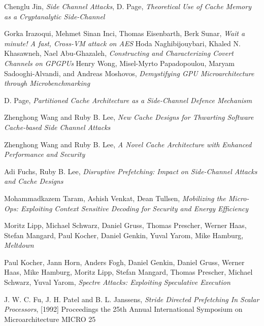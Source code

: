 \documentclass[twoside]{iitbreport}
\begin{document}
%
\begin{thebibliography}{99}
Chenglu Jin, {\it Side Channel Attacks},
D. Page, {\it Theoretical Use of Cache Memory as a Cryptanalytic Side-Channel}

Gorka Irazoqui, Mehmet Sinan Inci, Thomas Eisenbarth, Berk Sunar,  {\it Wait a minute! A fast, Cross-VM attack on AES}
Hoda Naghibijouybari,
Khaled N. Khasawneh,
Nael Abu-Ghazaleh,
{\it Constructing and Characterizing Covert Channels on GPGPUs}
Henry Wong, Misel-Myrto Papadopoulou, Maryam Sadooghi-Alvandi, and Andreas Moshovos, {\it Demystifying GPU Microarchitecture through Microbenchmarking}

D. Page, {\it Partitioned Cache Architecture as a Side-Channel Defence Mechanism}

Zhenghong Wang and Ruby B. Lee, {\it New Cache Designs for Thwarting Software Cache-based Side Channel Attacks}

Zhenghong Wang and Ruby B. Lee, {\it A Novel Cache Architecture with Enhanced Performance and Security}

Adi Fuchs, Ruby B. Lee, {\it Disruptive Prefetching: Impact on Side-Channel Attacks and Cache Designs}

Mohammadkazem Taram, Ashish Venkat, Dean Tullsen, {\it Mobilizing the Micro-Ops: Exploiting Context Sensitive Decoding for Security and Energy Efficiency}

Moritz Lipp, Michael Schwarz, Daniel Gruss, Thomas Prescher, Werner Haas,
Stefan Mangard, Paul Kocher, Daniel Genkin, Yuval Yarom, Mike Hamburg, {\it Meltdown}

Paul Kocher, Jann Horn, Anders Fogh, Daniel Genkin, Daniel Gruss, Werner Haas, Mike Hamburg, Moritz Lipp, Stefan Mangard, Thomas Prescher, Michael Schwarz, Yuval Yarom, {\it Spectre Attacks: Exploiting Speculative Execution}

J. W. C. Fu, J. H. Patel and B. L. Janssens, {\it Stride Directed Prefetching In Scalar Processors}, [1992] Proceedings the 25th Annual International Symposium on Microarchitecture MICRO 25


\end{thebibliography}
\end{document}
